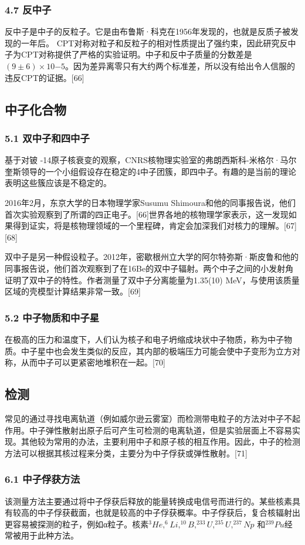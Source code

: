 \subsubsection{4.7 反中子}
反中子是中子的反粒子。它是由布鲁斯·科克在1956年发现的，也就是反质子被发现的一年后。 CPT对称对粒子和反粒子的相对性质提出了强约束，因此研究反中子为CPT对称提供了严格的实验证明。中子和反中子质量的分数差是$(9\pm6)\times10{-5}$。因为差异离零只有大约两个标准差，所以没有给出令人信服的违反CPT的证据。[66]

\subsection{中子化合物}
\subsubsection{5.1 双中子和四中子}
基于对铍 -14原子核衰变的观察，CNRS核物理实验室的弗朗西斯科-米格尔·马尔奎斯领导的一个小组假设存在稳定的4中子团簇，即四中子。有趣的是当前的理论表明这些簇应该是不稳定的。

2016年2月，东京大学的日本物理学家Susumu Shimoura和他的同事报告说，他们首次实验观察到了所谓的四正电子。[66]世界各地的核物理学家表示，这一发现如果得到证实，将是核物理领域的一个里程碑，肯定会加深我们对核力的理解。[67][68]

双中子是另一种假设粒子。2012年，密歇根州立大学的阿尔特弥斯·斯皮鲁和他的同事报告说，他们首次观察到了在16Be的双中子辐射。两个中子之间的小发射角证明了双中子的特性。作者测量了双中子分离能量为1.35(10) MeV，与使用该质量区域的壳模型计算结果非常一致。[69]

\subsubsection{5.2 中子物质和中子星}
在极高的压力和温度下，人们认为核子和电子坍缩成块状中子物质，称为中子物质。中子星中也会发生类似的反应，其内部的极端压力可能会使中子变形为立方对称，从而中子可以更紧密地堆积在一起。[70]

\subsection{检测}
常见的通过寻找电离轨道（例如威尔逊云雾室）而检测带电粒子的方法对中子不起作用。中子弹性散射出原子后可产生可检测的电离轨道，但是实验层面上不容易实现。其他较为常用的办法，主要利用中子和原子核的相互作用。因此，中子的检测方法可以根据其核过程来分类，主要分为中子俘获或弹性散射。[71]

\subsubsection{6.1 中子俘获方法}
该测量方法主要通过将中子俘获后释放的能量转换成电信号而进行的。某些核素具有较高的中子俘获截面，也就是较高的中子俘获概率。中子俘获后，复合核辐射出更容易被探测的粒子，例如α粒子。核素$^3He,^6Li,^{10}B,^{233}U,^{235}U,^{237}Np$ 和$^{239}Pu$经常被用于此种方法。

